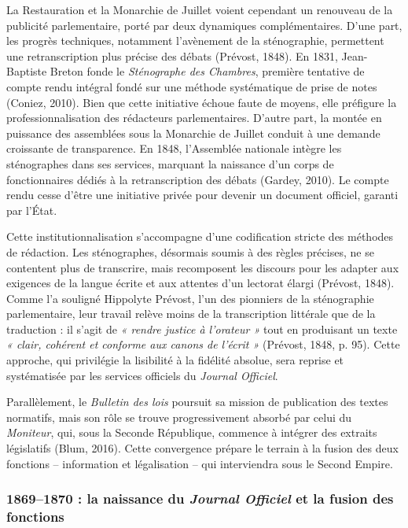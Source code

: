 La Restauration et la Monarchie de Juillet voient cependant un renouveau de la publicité parlementaire, porté par deux dynamiques complémentaires. D’une part, les progrès techniques, notamment l’avènement de la sténographie, permettent une retranscription plus précise des débats (Prévost, 1848). En 1831, Jean-Baptiste Breton fonde le \emph{Sténographe des Chambres}, première tentative de compte rendu intégral fondé sur une méthode systématique de prise de notes (Coniez, 2010). Bien que cette initiative échoue faute de moyens, elle préfigure la professionnalisation des rédacteurs parlementaires. D’autre part, la montée en puissance des assemblées sous la Monarchie de Juillet conduit à une demande croissante de transparence. En 1848, l’Assemblée nationale intègre les sténographes dans ses services, marquant la naissance d’un corps de fonctionnaires dédiés à la retranscription des débats (Gardey, 2010). Le compte rendu cesse d’être une initiative privée pour devenir un document officiel, garanti par l’État.

Cette institutionnalisation s’accompagne d’une codification stricte des méthodes de rédaction. Les sténographes, désormais soumis à des règles précises, ne se contentent plus de transcrire, mais recomposent les discours pour les adapter aux exigences de la langue écrite et aux attentes d’un lectorat élargi (Prévost, 1848). Comme l’a souligné Hippolyte Prévost, l’un des pionniers de la sténographie parlementaire, leur travail relève moins de la transcription littérale que de la traduction : il s’agit de \emph{« rendre justice à l’orateur »} tout en produisant un texte \emph{« clair, cohérent et conforme aux canons de l’écrit »} (Prévost, 1848, p. 95). Cette approche, qui privilégie la lisibilité à la fidélité absolue, sera reprise et systématisée par les services officiels du \emph{Journal Officiel}.

Parallèlement, le \emph{Bulletin des lois} poursuit sa mission de publication des textes normatifs, mais son rôle se trouve progressivement absorbé par celui du \emph{Moniteur}, qui, sous la Seconde République, commence à intégrer des extraits législatifs (Blum, 2016). Cette convergence prépare le terrain à la fusion des deux fonctions – information et légalisation – qui interviendra sous le Second Empire.

\subsubsection{1869–1870 : la naissance du \emph{Journal Officiel} et la fusion des fonctions}


